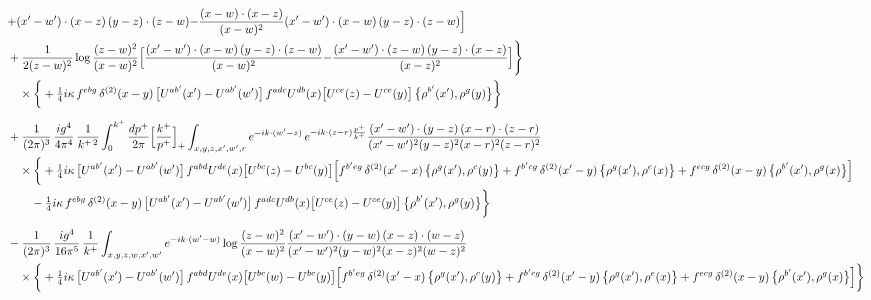 \documentclass[10pt]{article}
\numberwithin{equation}{section}
\begin{document}
\begin{align}
&{+(x^{\prime}-w^{\prime})\cdot(x-z)\,(y-z)\cdot(z-w)}{-\frac{(x-w)\cdot(x-z)}{(x-w)^{2}}(x^{\prime}-w^{\prime})\cdot(x-w)\,(y-z)\cdot(z-w)}\Big]\notag\\
&+\frac{1}{2(z-w)^{2}}\log\frac{(z-w)^{2}}{(x-w)^{2}}\Big[{\frac{(x^{\prime}-w^{\prime})\cdot(x-w)\,(y-z)\cdot(z-w)}{(x-w)^{2}}}{-\frac{(x^{\prime}-w^{\prime})\cdot(z-w)\,(y-z)\cdot(x-z)}{(x-z)^{2}}}\Big]\Bigg\}\notag\\
&\quad\times\bigg\{+\tfrac14 i\kappa\,f^{ebg}\,\delta^{(2)}(x-y)\,\big[U^{ab^{\prime}}(x^{\prime})-U^{ab^{\prime}}(w^{\prime})\big]\,f^{adc}U^{db}(x)\big[U^{ce}(z)-U^{ce}(y)\big]\,\big\{\rho^{b^{\prime}}(x^{\prime}),\rho^{g}(y)\big\}\bigg\}\notag\\[6pt]
&+\frac{1}{(2\pi)^{3}}\,\frac{ig^{4}}{4\pi^{4}}\,\frac{1}{k^{+\,2}}\int_{0}^{k^{+}}\frac{dp^{+}}{2\pi}\Big[\frac{k^{+}}{p^{+}}\Big]_{+}\int_{x,y,z,x^{\prime},w^{\prime},r}e^{-ik\cdot(w^{\prime}-z)}\,e^{-ik\cdot(z-r)\frac{p^{+}}{k^{+}}}\frac{(x^{\prime}-w^{\prime})\cdot(y-z)\,(x-r)\cdot(z-r)}{(x^{\prime}-w^{\prime})^{2}(y-z)^{2}(x-r)^{2}(z-r)^{2}}\notag\\
&\quad\times\bigg\{+\tfrac14 i\kappa\,\big[U^{ab^{\prime}}(x^{\prime})-U^{ab^{\prime}}(w^{\prime})\big]\,f^{abd}U^{de}(x)\big[U^{bc}(z)-U^{bc}(y)\big]\Big[f^{b^{\prime}eg}\,\delta^{(2)}(x^{\prime}-x)\,\big\{\rho^{g}(x^{\prime}),\rho^{c}(y)\big\}+f^{b^{\prime}cg}\,\delta^{(2)}(x^{\prime}-y)\,\big\{\rho^{g}(x^{\prime}),\rho^{e}(x)\big\}+f^{ecg}\,\delta^{(2)}(x-y)\,\big\{\rho^{b^{\prime}}(x^{\prime}),\rho^{g}(x)\big\}\Big]\notag\\
&\qquad-\tfrac14 i\kappa\,f^{ebg}\,\delta^{(2)}(x-y)\,\big[U^{ab^{\prime}}(x^{\prime})-U^{ab^{\prime}}(w^{\prime})\big]\,f^{adc}U^{db}(x)\big[U^{ce}(z)-U^{ce}(y)\big]\,\big\{\rho^{b^{\prime}}(x^{\prime}),\rho^{g}(y)\big\}\bigg\}\notag\\[6pt]
&-\frac{1}{(2\pi)^{3}}\,\frac{ig^{4}}{16\pi^{5}}\,\frac{1}{k^{+}}\int_{x,y,z,w,x^{\prime},w^{\prime}}e^{-ik\cdot(w^{\prime}-w)}\log\frac{(z-w)^{2}}{(x-w)^{2}}\frac{(x^{\prime}-w^{\prime})\cdot(y-w)\,(x-z)\cdot(w-z)}{(x^{\prime}-w^{\prime})^{2}(y-w)^{2}(x-z)^{2}(w-z)^{2}}\notag\\
&\quad\times\bigg\{+\tfrac14 i\kappa\,\big[U^{ab^{\prime}}(x^{\prime})-U^{ab^{\prime}}(w^{\prime})\big]\,f^{abd}U^{de}(x)\big[U^{bc}(w)-U^{bc}(y)\big]\Big[f^{b^{\prime}eg}\,\delta^{(2)}(x^{\prime}-x)\,\big\{\rho^{g}(x^{\prime}),\rho^{c}(y)\big\}+f^{b^{\prime}cg}\,\delta^{(2)}(x^{\prime}-y)\,\big\{\rho^{g}(x^{\prime}),\rho^{e}(x)\big\}+f^{ecg}\,\delta^{(2)}(x-y)\,\big\{\rho^{b^{\prime}}(x^{\prime}),\rho^{g}(x)\big\}\Big]\bigg\}\notag\\[6pt]

\end{align}
\end{document}
